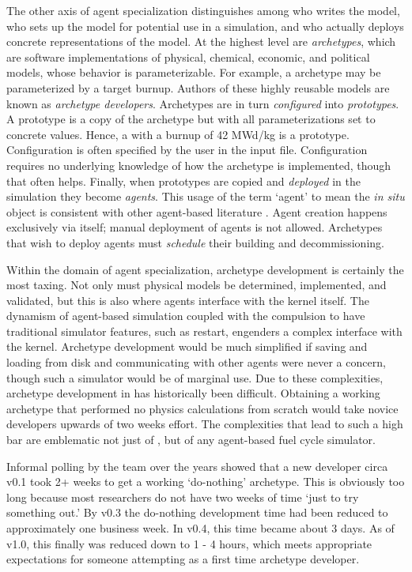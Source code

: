 The other axis of agent specialization distinguishes among who 
writes the model, who sets up the model for potential use in a simulation,
and who actually deploys concrete representations of the model.
At the highest level are \emph{archetypes}, which are software implementations
of physical, chemical, economic, and political models, whose behavior
is parameterizable. For example, a   archetype may be 
parameterized by a target burnup. Authors of these highly reusable models 
are known as \emph{archetype developers}. Archetypes are in turn 
\emph{configured} into \emph{prototypes}. A prototype is a copy 
of the archetype but with all parameterizations set to concrete 
values. Hence, a  with a burnup of 42 MWd/kg is a 
prototype. Configuration is often specified by the \cyclus user 
in the input file. Configuration requires no underlying knowledge of 
how the archetype is implemented, though that often helps.
Finally, when prototypes are copied and \emph{deployed} in the simulation 
they become \emph{agents}. This usage of the term `agent' to mean 
the \emph{in situ} object is consistent with other agent-based
literature \cite{macal2005tutorial}.  Agent creation happens exclusively via 
\cyclus itself; manual deployment of agents is not allowed.
Archetypes that wish to deploy agents must \emph{schedule} their building
and decommissioning.

Within the domain of agent specialization, archetype development is certainly 
the most taxing.
Not only must physical models be determined, implemented, and 
validated, but this is also where agents interface with the 
\cyclus kernel itself. The dynamism of agent-based simulation 
coupled with the compulsion to have traditional simulator features, 
such as restart, engenders a complex interface with the kernel.
Archetype development would be much simplified if saving and 
loading from disk and communicating with other agents were 
never a concern, though such a simulator would be of marginal use.
Due to these complexities, archetype development in \cyclus
has historically been difficult. Obtaining a working archetype
that performed no physics calculations from scratch would 
take novice developers upwards of two weeks effort.  The complexities
that lead to such a high bar are emblematic not just of \cyclus,
but of any agent-based fuel cycle simulator.

Informal polling by the \cyclus team over the years
showed that a new developer circa \cyclus v0.1
took 2+ weeks to get a working `do-nothing' archetype. This is obviously 
too long because most researchers do not have two weeks of time `just to try 
something out.' By \cyclus v0.3 the do-nothing development time had been reduced 
to approximately one business week. In \cyclus v0.4, this time became about 3 days.
As of \cyclus v1.0, this finally was reduced down to 1 - 4 hours, which meets
appropriate expectations for someone attempting \cyclus as a first time archetype 
developer.

